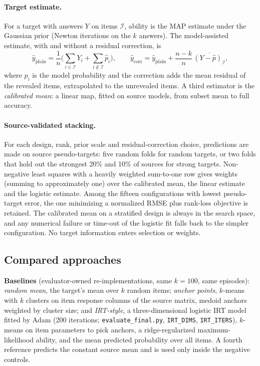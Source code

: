 \documentclass{article}
\begin{document}
\paragraph{Target estimate.} For a target with answers $Y$ on items $\mathcal I$, ability is the MAP estimate under the Gaussian prior (Newton iterations on the $k$ answers). The model-assisted estimate, with and without a residual correction, is
\[
\hat y_{\text{plain}} = \frac1n\Big(\sum_{i\in\mathcal I} Y_i+\sum_{i\notin\mathcal I}\hat p_i\Big),\qquad
\hat y_{\text{corr}} = \hat y_{\text{plain}} + \frac{n-k}{n}\,\overline{(Y-\hat p)_{\mathcal I}},
\]
where $\hat p_i$ is the model probability and the correction adds the mean residual of the revealed items, extrapolated to the unrevealed items. A third estimator is the \emph{calibrated mean}: a linear map, fitted on source models, from subset mean to full accuracy.

\paragraph{Source-validated stacking.} For each design, rank, prior scale and residual-correction choice, predictions are made on source pseudo-targets: five random folds for random targets, or two folds that hold out the strongest 20\% and 10\% of sources for strong targets. Non-negative least squares with a heavily weighted sum-to-one row gives weights (summing to approximately one) over the calibrated mean, the linear estimate and the logistic estimate. Among the fifteen configurations with lowest pseudo-target error, the one minimizing a normalized RMSE plus rank-loss objective is retained. The calibrated mean on a stratified design is always in the search space, and any numerical failure or time-out of the logistic fit falls back to the simpler configuration. No target information enters selection or weights.

\subsection{Compared approaches}
\textbf{Baselines} (evaluator-owned re-implementations, same $k=100$, same episodes): \emph{random mean}, the target's mean over $k$ random items; \emph{anchor points}, $k$-means with $k$ clusters on item response columns of the source matrix, medoid anchors weighted by cluster size; and \emph{IRT-style}, a three-dimensional logistic IRT model fitted by Adam (200 iterations; \texttt{evaluate\_final.py}, \texttt{IRT\_DIMS}, \texttt{IRT\_ITERS}), $k$-means on item parameters to pick anchors, a ridge-regularized maximum-likelihood ability, and the mean predicted probability over all items. A fourth reference predicts the constant source mean and is used only inside the negative controls.
\end{document}

